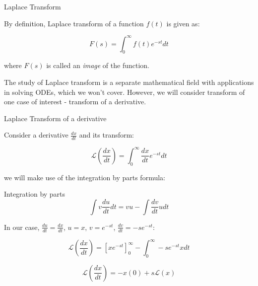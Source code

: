 \documentclass{beamer}
\begin{document}
\begin{frame}{Laplace Transform}
\begin{flushleft}

By definition, Laplace transform of a function $f(t)$ is given as:

\begin{equation}
    F(s) = \int_0^\infty f(t) e^{-st}dt
\end{equation}

where $F(s)$ is called an \emph{image} of the function.

\bigskip

The study of Laplace transform is a separate mathematical field with applications in solving ODEs, which we won't cover. However, we will consider transform of one case of interest - transform of a derivative. 

\end{flushleft}
\end{frame}



\begin{frame}{Laplace Transform of a derivative}
\begin{flushleft}

Consider a derivative $\frac{dx}{dt}$ and its transform:

\begin{equation}
    \mathcal{L}\left(\frac{dx}{dt}\right) = \int_0^\infty \frac{dx}{dt} e^{-st}dt
\end{equation}

we will make use of the integration by parts formula:

\begin{block}{Integration by parts}
\begin{equation}
\int v \frac{du}{dt} dt = vu - 
\int \frac{dv}{dt} u dt    
\end{equation}
\end{block}

In our case, $\frac{du}{dt} = \frac{dx}{dt}$, $u = x$, $v = e^{-st}$, $\frac{dv}{dt} = -se^{-st}$:

\begin{equation}
\mathcal{L}\left(\frac{dx}{dt}\right) = \left[x e^{-st} \right]_0^\infty - 
\int_0^\infty -se^{-st} x dt  
\end{equation}

\begin{equation}
\mathcal{L}\left(\frac{dx}{dt}\right) = -x(0) + s\mathcal{L}(x)  
\end{equation}

\end{flushleft}
\end{frame}
\end{document}
